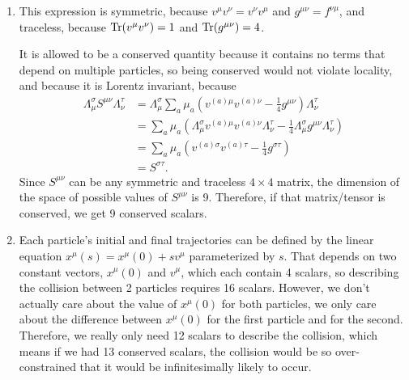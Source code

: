 \documentclass{article}
\begin{document}
\bigskip
\par
\begin{prob}
\end{prob}
\begin{enumerate}[label=(\alph*)]
    \item This expression is symmetric, because $v^\mu v^\nu = v^\nu v^\mu$ and $g^{\mu \nu} = f^{\nu \mu}$, and traceless, because $\operatorname{Tr}(v^\mu v^\nu)=1$ and $\operatorname{Tr}(g^{\mu \nu})=4$.
        \par
        It is allowed to be a conserved quantity because it contains no terms that depend on multiple particles, so being conserved would not violate locality, and because it is Lorentz invariant, because
        \begin{align*}
            \Lambda_\mu^\sigma S^{\mu \nu} \Lambda_\nu^\tau &= \Lambda_\mu^\sigma\sum_a \mu_a \left( v^{(a)\mu} v^{(a) \nu} - \frac{1}{4} g^{\mu \nu} \right) \Lambda_\nu^\tau \\
                                                            &= \sum_a \mu_a \left( \Lambda_\mu^\sigma v^{(a)\mu} v^{(a) \nu} \Lambda_\nu^\tau - \frac{1}{4} \Lambda_\mu^\sigma g^{\mu \nu} \Lambda_\nu^\tau \right) \\
                                                            &= \sum_a \mu_a \left( v^{(a)\sigma} v^{(a) \tau} - \frac{1}{4} g^{\sigma \tau} \right) \\
                                                            &= S^{\sigma \tau}.
        \end{align*}
        Since $S^{\mu \nu}$ can be any symmetric and traceless $4 \times 4$ matrix, the dimension of the space of possible values of $S^{\mu \nu}$ is 9. Therefore, if that matrix/tensor is conserved, we get 9 conserved scalars.
    \item Each particle's initial and final trajectories can be defined by the linear equation $x^\mu(s) = x^\mu(0) + s v^\mu$ parameterized by $s$. That depends on two constant vectors, $x^\mu(0)$ and $v^\mu$, which each contain 4 scalars, so describing the collision between 2 particles requires 16 scalars. However, we don't actually care about the value of $x^\mu(0)$ for both particles, we only care about the difference between $x^\mu(0)$ for the first particle and for the second. Therefore, we really only need 12 scalars to describe the collision, which means if we had 13 conserved scalars, the collision would be so over-constrained that it would be infinitesimally likely to occur.
\end{enumerate}
\end{document}
